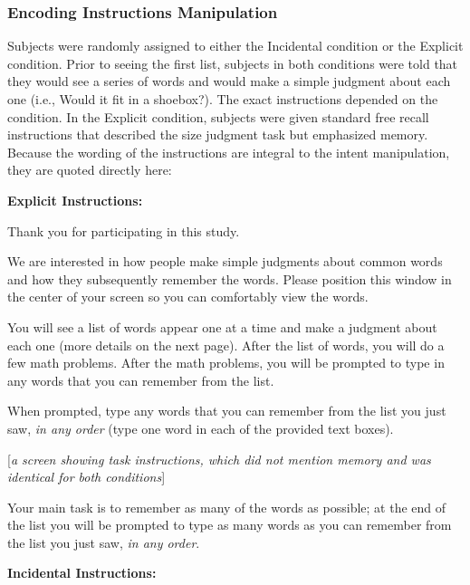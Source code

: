\documentclass[jou,natbib]{apa6} %
\begin{document}
\subsubsection{Encoding Instructions Manipulation} Subjects were randomly assigned to either the Incidental condition or the Explicit condition. Prior to seeing the first list, subjects in both conditions were told that they would see a series of words and would make a simple judgment about each one (i.e., Would it fit in a shoebox?). The exact instructions depended on the condition. In the Explicit condition, subjects were given standard free recall instructions that described the size judgment task but emphasized memory. Because the wording of the instructions are integral to the intent manipulation, they are quoted directly here:

\textbf{Explicit Instructions:}

\begin{displayquote}
        Thank you for participating in this study. 

        We are interested in how people make simple judgments about common words and
        how they subsequently remember the words. Please position this window in the center
        of your screen so you can comfortably view the words.

        You will see a list of words appear one at a time and make a judgment about each one
        (more details on the next page). After the list of words, you will do a few math problems.
        After the math problems, you will be prompted to type in any words that you can remember
        from the list.

        When prompted, type any words that you can remember from the list you just saw,
        \emph{in any order} (type one word in each of the provided text boxes).

    [\textit{a screen showing task instructions, which did not mention memory and was identical for both conditions}]

        Your main task is to remember as many of the words as possible; at the end of the list you will be prompted to
    type as many words as you can remember from the list you just saw, \emph{in any order}.
\end{displayquote}


\textbf{Incidental Instructions:}
\end{document}
